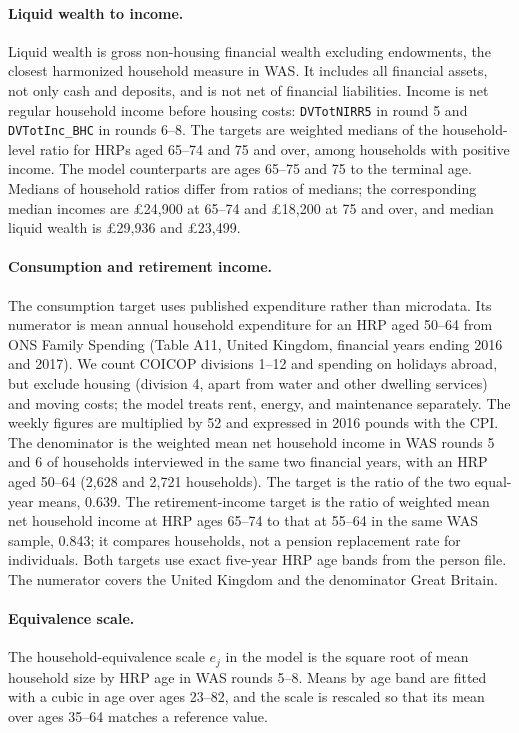 \paragraph{Liquid wealth to income.} Liquid wealth is gross non-housing
financial wealth excluding endowments, the closest harmonized household
measure in WAS. It includes all financial assets, not only cash and
deposits, and is not net of financial liabilities. Income is net regular
household income before housing costs: \texttt{DVTotNIRR5} in round 5 and
\texttt{DVTotInc\_BHC} in rounds 6--8. The targets are weighted medians of
the household-level ratio for HRPs aged 65--74 and 75 and over, among
households with positive income. The model counterparts are ages 65--75 and
75 to the terminal age. Medians of household ratios differ from ratios of
medians; the corresponding median incomes are £24,900 at 65--74 and
£18,200 at 75 and over, and median liquid wealth is £29,936 and £23,499.

\paragraph{Consumption and retirement income.} The consumption target uses
published expenditure rather than microdata. Its numerator is mean annual
household expenditure for an HRP aged 50--64 from ONS Family Spending
(Table A11, United Kingdom, financial years ending 2016 and 2017). We count
COICOP divisions 1--12 and spending on holidays abroad, but exclude
housing (division 4, apart from water and other dwelling services) and
moving costs; the model treats rent, energy, and maintenance separately. The weekly figures are multiplied by 52 and expressed in 2016
pounds with the CPI. The denominator is the weighted mean net household
income in WAS rounds 5 and 6 of households interviewed in the same two
financial years, with an HRP aged 50--64 (2,628 and 2,721 households). The
target is the ratio of the two equal-year means, 0.639. The
retirement-income target is the ratio of weighted mean net household income
at HRP ages 65--74 to that at 55--64 in the same WAS sample, 0.843; it
compares households, not a pension replacement rate for individuals.
Both targets use exact five-year HRP age bands from the person file. The
numerator covers the United Kingdom and the denominator Great Britain.


\paragraph{Equivalence scale.} The household-equivalence scale $e_j$ in the
model is the square root of mean household size by HRP age in WAS rounds
5--8. Means by age band are fitted with a cubic in age over ages 23--82,
and the scale is rescaled so that its mean over ages 35--64 matches a
reference value. 
